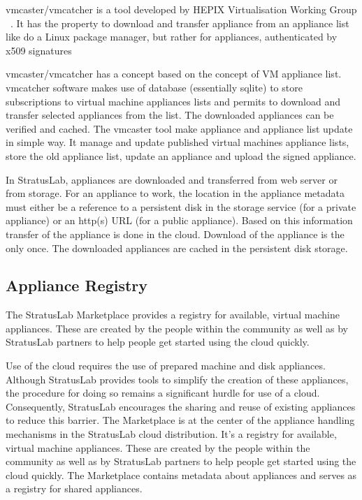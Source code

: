 vmcaster/vmcatcher is a tool developed by HEPIX Virtualisation Working
Group ~\cite{hepixbooktransfer}. It has the property to download and transfer appliance from an
appliance list like do a Linux package manager, but rather for
appliances, authenticated by x509 signatures

vmcaster/vmcatcher has a concept based on the concept of VM appliance
list.  vmcatcher software makes use of database (essentially sqlite)
to store subscriptions to virtual machine appliances lists and permits
to download and transfer selected appliances from the list. The
downloaded appliances can be verified and cached.  The vmcaster tool
make appliance and appliance list update in simple way. It manage and
update published virtual machines appliance lists, store the old
appliance list, update an appliance and upload the signed appliance.

In StratusLab, appliances are downloaded and transferred from web
server or from storage. For an appliance to work, the location in the
appliance metadata must either be a reference to a persistent disk in
the storage service (for a private appliance) or an http(s) URL (for a
public appliance). Based on this information transfer of the appliance
is done in the cloud.  Download of the appliance is the only once. The
downloaded appliances are cached in the persistent disk storage.

\subsection{Appliance Registry}

The StratusLab Marketplace provides a registry for available, virtual
machine appliances. These are created by the people within the
community as well as by StratusLab partners to help people get started
using the cloud quickly.

Use of the cloud requires the use of prepared machine and disk
appliances. Although StratusLab provides tools to simplify the
creation of these appliances, the procedure for doing so remains a
significant hurdle for use of a cloud. Consequently, StratusLab
encourages the sharing and reuse of existing appliances to reduce this
barrier.  The Marketplace is at the center of the appliance handling
mechanisms in the StratusLab cloud distribution. It's a registry for
available, virtual machine appliances. These are created by the people
within the community as well as by StratusLab partners to help people
get started using the cloud quickly.  The Marketplace contains
metadata about appliances and serves as a registry for shared
appliances.

